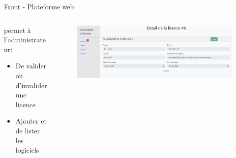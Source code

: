 \documentclass{cubeamer}
\begin{document}
\begin{frame}{Front - Plateforme web}
        \begin{columns}

        \begin{column}{.25\textwidth}
            permet à l'administrateur:
            \begin{itemize}
                \item De valider ou d'invalider une licence
                \item Ajouter et de lister les logiciels
            \end{itemize} 
        \end{column}

        \begin{column}{.75\textwidth}
            \begin{figure}
                \includegraphics[scale=0.27]{img/web2.png}
            \end{figure}  
        \end{column} 

    \end{columns}       
\end{frame}
\end{document}
